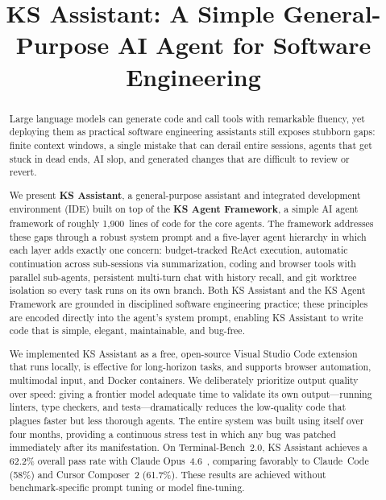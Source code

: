 \documentclass{article}
\title{KS Assistant: A Simple General-Purpose AI Agent for Software Engineering}
\author{}
\begin{document}
\maketitle

\begin{abstract}
Large language models can generate code and call tools with remarkable fluency, yet deploying them as practical software engineering assistants still exposes stubborn gaps: finite context windows, a single mistake that can derail entire sessions, agents that get stuck in dead ends, AI slop, and generated changes that are difficult to review or revert.

We present \textbf{KS Assistant}, a general-purpose assistant and integrated development environment (IDE) built on top of the \textbf{KS Agent Framework}, a simple AI agent framework of roughly 1,900~lines of code for the core agents.  The framework addresses these gaps through a robust system prompt and a five-layer agent hierarchy in which each layer adds exactly one concern: budget-tracked ReAct execution, automatic continuation across sub-sessions via summarization, coding and browser tools with parallel sub-agents, persistent multi-turn chat with history recall, and git worktree isolation so every task runs on its own branch.  Both KS Assistant and the KS Agent Framework are grounded in disciplined software engineering practice; these principles are encoded directly into the agent's system prompt, enabling KS Assistant to write code that is simple, elegant, maintainable, and bug-free.

We implemented KS Assistant as a free, open-source Visual Studio Code extension that runs locally, is effective for long-horizon tasks, and supports browser automation, multimodal input, and Docker containers.  We deliberately prioritize output quality over speed: giving a frontier model adequate time to validate its own output---running linters, type checkers, and tests---dramatically reduces the low-quality code that plagues faster but less thorough agents.  The entire system was built using itself over four months, providing a continuous stress test in which any bug was patched immediately after its manifestation.  On Terminal-Bench~2.0, KS Assistant achieves a 62.2\% overall pass rate with Claude Opus~4.6~\citep{anthropic2026opus46}, comparing favorably to Claude~Code (58\%) and Cursor Composer~2 (61.7\%).  These results are achieved without benchmark-specific prompt tuning or model fine-tuning.
\end{abstract}
\end{document}
